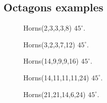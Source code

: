 \documentclass[11pt]{article}
\begin{document}
\subsection{Octagons examples}

\begin{figure}[H]
\centering
{}
\caption{Horns(2,3,3,3,8) $45^\circ$.}
\end{figure}

\begin{figure}[H]
\centering
{}
\caption{Horns(3,2,3,7,12) $45^\circ$.}
\end{figure}

\begin{figure}[H]
\centering
{}
\caption{Horns(14,9,9,9,16) $45^\circ$.}
\end{figure}

\begin{figure}[H]
\centering
{}
\caption{Horns(14,11,11,11,24) $45^\circ$.}
\end{figure}

\begin{figure}[H]
\centering
{}
\caption{Horns(21,21,14,6,24) $45^\circ$.}
\end{figure}
\end{document}
